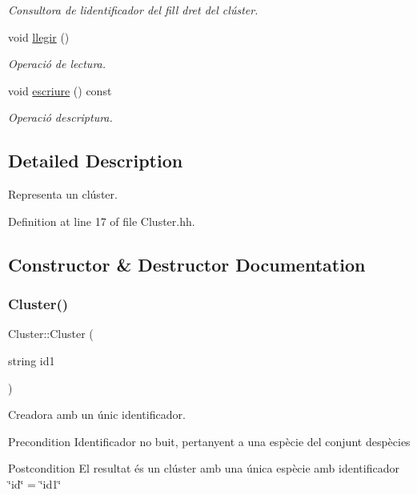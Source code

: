 \begin{DoxyCompactItemize}
\begin{DoxyCompactList}\small\item\em Consultora de l\textquotesingle{}identificador del fill dret del clúster. \end{DoxyCompactList}\item 
void \hyperlink{class_cluster_addf8d8d2beb59cf5b5fd7e0eed491e7e}{llegir} ()
\begin{DoxyCompactList}\small\item\em Operació de lectura. \end{DoxyCompactList}\item 
void \hyperlink{class_cluster_aae67c144fc543eace946dc8a651b5b7a}{escriure} () const
\begin{DoxyCompactList}\small\item\em Operació d\textquotesingle{}escriptura. \end{DoxyCompactList}\end{DoxyCompactItemize}


\subsection{Detailed Description}
Representa un clúster. 

Definition at line 17 of file Cluster.\+hh.



\subsection{Constructor \& Destructor Documentation}
\mbox{\label{class_cluster_ac81cfcf15eac35bd1c3d8802ec044a5f}} 
\subsubsection{\texorpdfstring{Cluster()}{Cluster()}\hspace{0.1cm}{\footnotesize\ttfamily [1/2]}}
{\footnotesize\ttfamily Cluster\+::\+Cluster (\begin{DoxyParamCaption}\item[{string}]{id1 }\end{DoxyParamCaption})}



Creadora amb un únic identificador. 

\begin{DoxyPrecond}{Precondition}
Identificador no buit, pertanyent a una espècie del conjunt d\textquotesingle{}espècies 
\end{DoxyPrecond}
\begin{DoxyPostcond}{Postcondition}
El resultat és un clúster amb una única espècie amb identificador \char`\"{}id\char`\"{} = \char`\"{}id1\char`\"{} 
\end{DoxyPostcond}
\mbox{\label{class_cluster_a3a657a86432eb76d41831b44a94e99d0}} 
